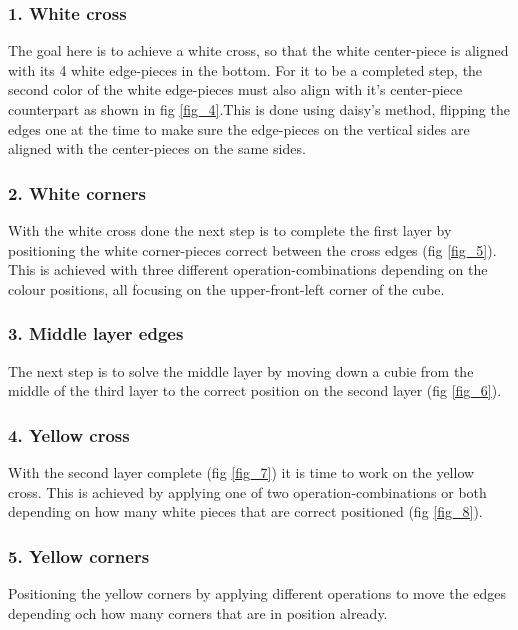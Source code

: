 \documentclass[a4paper,11pt]{kth-mag}
\begin{document}
\subsubsection{1. White cross}
The goal here is to achieve a white cross, so that the white center-piece is aligned with its 4 white edge-pieces in the bottom. For it to be a completed step, the second color of the white edge-pieces must also align with it’s center-piece counterpart as shown in fig \ref{fig_4}.This is done using daisy's method, flipping the edges one at the time to make sure the edge-pieces on the vertical sides are aligned with the center-pieces on the same sides.
\subsubsection{2. White corners}
With the white cross done the next step is to complete the first layer by positioning the white corner-pieces correct between the cross edges (fig \ref{fig_5}). This is achieved with three different operation-combinations depending on the colour positions, all focusing on the upper-front-left corner of the cube.
\subsubsection{3. Middle layer edges}
The next step is to solve the middle layer by moving down a cubie from the middle of the third layer to the correct position on the second layer (fig \ref{fig_6}). 
\subsubsection{4. Yellow cross}
With the second layer complete (fig \ref{fig_7}) it is time to work on the yellow cross. This is achieved by applying one of two operation-combinations or both depending on how many white pieces that are correct positioned (fig \ref{fig_8}).  
\subsubsection{5. Yellow corners}
Positioning the yellow corners by applying different operations to move the edges depending och how many corners that are in position already. 
\end{document}
